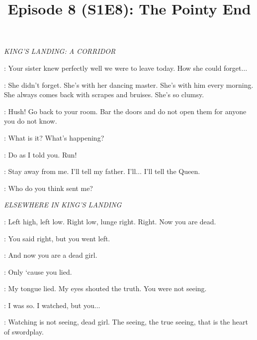 

\title{Episode 8 (S1E8): The Pointy End}
\author{}
\date{}
\maketitle




\scene

\textit{KING'S LANDING: A CORRIDOR} 


\SEPTAMORDANE: Your sister knew perfectly well we were to leave today. How she could forget$\ldots$  

\SANSA: She didn't forget. She's with her dancing master. She's with him every morning. She always comes back with scrapes and bruises. She's so clumsy. 


\SEPTAMORDANE: Hush! Go back to your room. Bar the doors and do not open them for anyone you do not know. 

\SANSA: What is it? What's happening? 

\SEPTAMORDANE: Do as I told you. Run! 


\SANSA: Stay away from me. I'll tell my father. I'll$\ldots$ I'll tell the Queen. 

\HOUND: Who do you think sent me? 


\scene

\textit{ELSEWHERE IN KING'S LANDING} 


\SYRIO: Left high, left low. Right low, lunge right. Right.  Now you are dead.

\ARYA: You said right, but you went left. 

\SYRIO: And now you are a dead girl. 

\ARYA: Only `cause you lied. 

\SYRIO: My tongue lied. My eyes shouted the truth. You were not seeing. 

\ARYA: I was so. I watched, but you$\ldots$ 

\SYRIO: Watching is not seeing, dead girl. The seeing, the true seeing, that is the heart of swordplay. 


